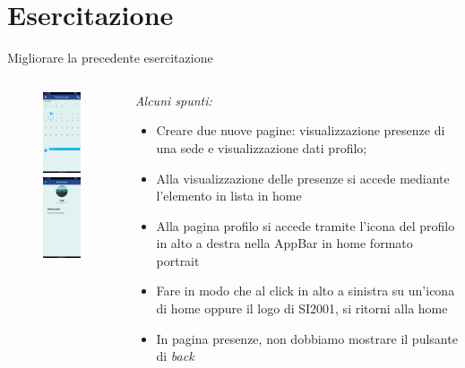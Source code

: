 \documentclass{../libs/presentation_format}
\begin{document}


\section{Esercitazione}
\begin{frame}{Migliorare la precedente esercitazione}
	\begin{minipage}[0.2\textheight]{\textwidth}
		\begin{columns}[T]
			\begin{column}{0.4\textwidth}
				\begin{figure}[htpb]
					\centering
					\includegraphics[width=2cm]{../libs/assignment-calendar}
					\includegraphics[width=2cm]{../libs/assignment-profile}
				\end{figure}
			\end{column}
			\begin{column}{0.6\textwidth}
				\emph{Alcuni spunti:}
				\begin{itemize}
					\item Creare due nuove pagine: visualizzazione presenze di una sede e visualizzazione dati profilo;
					\item Alla visualizzazione delle presenze si accede mediante l'elemento in lista in home
					\item Alla pagina profilo si accede tramite l'icona del profilo in alto a destra nella AppBar in home formato portrait
					\item Fare in modo che al click in alto a sinistra su un'icona di home oppure il logo di SI2001, si ritorni alla home
					\item In pagina presenze, non dobbiamo mostrare il pulsante di \emph{back}
				\end{itemize}
			\end{column}
		\end{columns}
	\end{minipage}
\end{frame}
\end{document}

